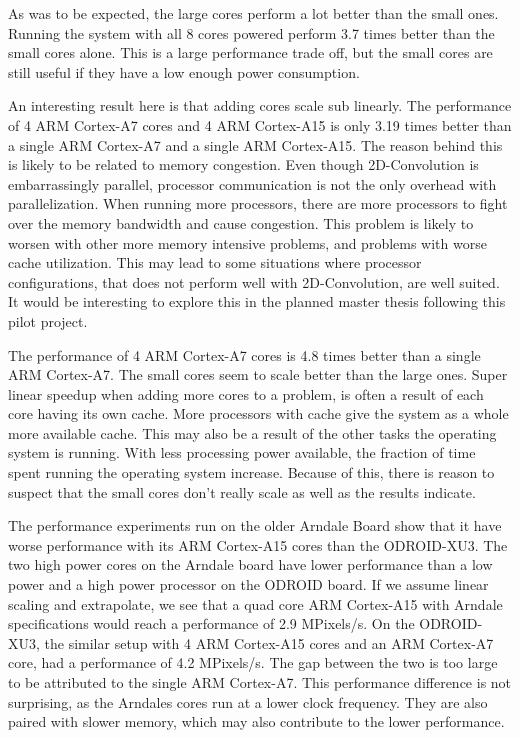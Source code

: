 As was to be expected, the large cores perform a lot better than the small ones.
Running the system with all 8 cores powered perform 3.7 times better than the small cores alone.
This is a large performance trade off, but the small cores are still useful if they have a low enough power consumption.

An interesting result here is that adding cores scale sub linearly.
The performance of 4 ARM Cortex-A7 cores and 4 ARM Cortex-A15 is only 3.19 times better than a single ARM Cortex-A7 and a single ARM Cortex-A15.
The reason behind this is likely to be related to memory congestion.
Even though 2D-Convolution is embarrassingly parallel, processor communication is not the only overhead with parallelization.
When running more processors, there are more processors to fight over the memory bandwidth and cause congestion.
This problem is likely to worsen with other more memory intensive problems, and problems with worse cache utilization.
This may lead to some situations where processor configurations, that does not perform well with 2D-Convolution, are well suited.
It would be interesting to explore this in the planned master thesis following this pilot project.

The performance of 4 ARM Cortex-A7 cores is 4.8 times better than a single ARM Cortex-A7.
The small cores seem to scale better than the large ones.
Super linear speedup when adding more cores to a problem, is often a result of each core having its own cache.
More processors with cache give the system as a whole more available cache.
This may also be a result of the other tasks the operating system is running.
With less processing power available, the fraction of time spent running the operating system increase.
Because of this, there is reason to suspect that the small cores don't really scale as well as the results indicate.

The performance experiments run on the older Arndale Board show that it have worse performance with its ARM Cortex-A15 cores than the ODROID-XU3.
The two high power cores on the Arndale board have lower performance than a low power and a high power processor on the ODROID board.
If we assume linear scaling and extrapolate, we see that a quad core ARM Cortex-A15 with Arndale specifications would reach a performance of 2.9 MPixels/s.
On the ODROID-XU3, the similar setup with 4 ARM Cortex-A15 cores and an ARM Cortex-A7 core, had a performance of 4.2 MPixels/s.
The gap between the two is too large to be attributed to the single ARM Cortex-A7.
This performance difference is not surprising, as the Arndales cores run at a lower clock frequency.
They are also paired with slower memory, which may also contribute to the lower performance.


